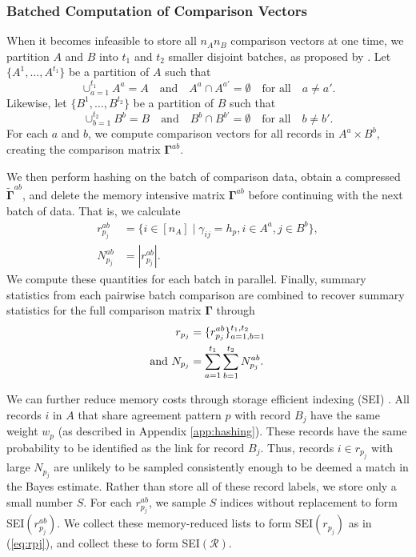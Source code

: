 \documentclass[12pt,letterpaper]{article}
\newcommand{\1}[1]{\mathbb{I}\!\left[#1\right]} %
\begin{document}
\subsubsection{Batched Computation of Comparison Vectors} \label{app:batching}
When it becomes infeasible to store all $n_A  n_B$ comparison vectors at one time, we partition $A$ and $B$ into $t_1$ and $t_2$ smaller disjoint batches, as proposed by \cite{kundinger_2023}. Let $\{A^1, \dots, A^{t_1}\}$ be a partition of $A$ such that 
$$\cup_{a=1}^{t_1} A^a = A \quad \text{and} \quad A^a \cap A^{a'}=\emptyset \quad \text{for all} \quad a \neq a'.$$  Likewise, let $\{B^1, \dots, B^{t_2}\}$ be a partition of $B$ such that 
$$\cup_{b=1}^{t_2} B^b = B \quad \text{and} \quad B^b \cap B^{b'}=\emptyset \quad \text{for all} \quad b \neq b'.$$ For each $a$ and $b$, we compute comparison vectors for all records in $A^a \times B^b$, creating the comparison matrix $\bm{\Gamma}^{ab}$. 

We then perform hashing on the batch of comparison data, obtain a compressed $\tilde{\bm{\Gamma}}^{ab}$, and delete the memory intensive matrix $\bm{\Gamma}^{ab}$ before continuing with the next batch of data. That is, we calculate
\begin{align*}
	r_{p_j}^{ab} &= \{i \in [n_A]\mid \gamma_{ij} = h_p, i\in A^a, j \in B^b\}, \\
	N_{p_j}^{ab} &= |r_{p_j}^{ab}|.
\end{align*}
We compute these quantities for each batch in parallel. Finally, summary statistics from each pairwise batch comparison are combined to recover summary statistics for the full comparison matrix $\bm{\Gamma}$ through
\begin{align}
	r_{p_j} &= \{r_{p_j}^{ab}\}_{a=1, b=1}^{t_1,t_2} \label{eq:rpj}  \\
	\text{and } N_{p_j} &= \sum_{a = 1}^{t_1} \sum_{b = 1}^{t_2} N_{p_j}^{ab}. \notag
\end{align}

We can further reduce memory costs through storage efficient indexing (SEI) \citep{kundinger_2023}. All records $i$ in $A$ that share agreement pattern $p$ with record $B_j$ have the same weight $w_{p}$ (as described in Appendix \ref{app:hashing}). These records have the same probability to be identified as the link for record $B_j$. Thus, records $i \in r_{p_j}$ with large $N_{p_j}$ are unlikely to be sampled consistently enough to be deemed a match in the Bayes estimate. Rather than store all of these record labels, we store only a small number $S$. For each $r_{p_j}^{ab}$, we sample $S$ indices without replacement to form SEI$(r_{p_j}^{ab})$. We collect these memory-reduced lists to form SEI$(r_{p_j})$ as in (\ref{eq:rpj}), and collect these to form SEI$(\mathcal{R})$.
\end{document}
